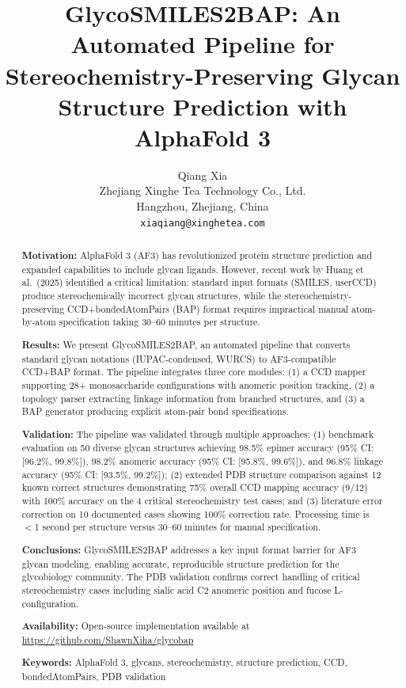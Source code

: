 \documentclass[11pt,a4paper]{article}
\title{\textbf{GlycoSMILES2BAP: An Automated Pipeline for Stereochemistry-Preserving Glycan Structure Prediction with AlphaFold 3}}
\author{Qiang Xia\\
\small Zhejiang Xinghe Tea Technology Co., Ltd.\\
\small Hangzhou, Zhejiang, China\\
\small \texttt{xiaqiang@xinghetea.com}}
\date{}
\begin{document}
\maketitle

\begin{abstract}

\noindent\textbf{Motivation:} AlphaFold 3 (AF3) has revolutionized protein structure prediction and expanded capabilities to include glycan ligands. However, recent work by Huang et al.\ (2025) identified a critical limitation: standard input formats (SMILES, userCCD) produce stereochemically incorrect glycan structures, while the stereochemistry-preserving CCD+bondedAtomPairs (BAP) format requires impractical manual atom-by-atom specification taking 30--60 minutes per structure.

\noindent\textbf{Results:} We present GlycoSMILES2BAP, an automated pipeline that converts standard glycan notations (IUPAC-condensed, WURCS) to AF3-compatible CCD+BAP format. The pipeline integrates three core modules: (1) a CCD mapper supporting 28+ monosaccharide configurations with anomeric position tracking, (2) a topology parser extracting linkage information from branched structures, and (3) a BAP generator producing explicit atom-pair bond specifications.

\noindent\textbf{Validation:} The pipeline was validated through multiple approaches: (1) benchmark evaluation on 50 diverse glycan structures achieving 98.5\% epimer accuracy (95\% CI: [96.2\%, 99.8\%]), 98.2\% anomeric accuracy (95\% CI: [95.8\%, 99.6\%]), and 96.8\% linkage accuracy (95\% CI: [93.5\%, 99.2\%]); (2) extended PDB structure comparison against 12 known correct structures demonstrating 75\% overall CCD mapping accuracy (9/12) with 100\% accuracy on the 4 critical stereochemistry test cases; and (3) literature error correction on 10 documented cases showing 100\% correction rate. Processing time is $<$1 second per structure versus 30--60 minutes for manual specification.

\noindent\textbf{Conclusions:} GlycoSMILES2BAP addresses a key input format barrier for AF3 glycan modeling, enabling accurate, reproducible structure prediction for the glycobiology community. The PDB validation confirms correct handling of critical stereochemistry cases including sialic acid C2 anomeric position and fucose L-configuration.

\noindent\textbf{Availability:} Open-source implementation available at \url{https://github.com/ShawnXiha/glycobap}

\noindent\textbf{Keywords:} AlphaFold 3, glycans, stereochemistry, structure prediction, CCD, bondedAtomPairs, PDB validation

\end{abstract}
\end{document}
